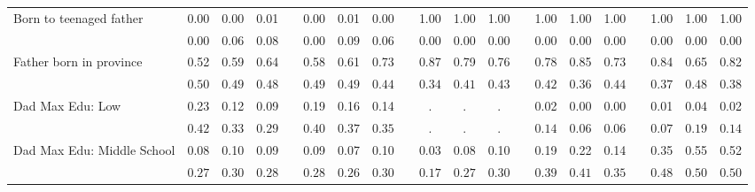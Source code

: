 \begin{center}
{\begin{longtable}{L{6cm} c c c p{.5cm} c c c p{.5cm} c c c p{.5cm} c c c p{.5cm} c c c}
 \quad Born to teenaged father & 0.00 &      0.00 &      0.01 & &      0.00 &      0.01 &      0.00 & &      1.00 &      1.00 &      1.00 & &      1.00 &      1.00 &      1.00 & &      1.00 &      1.00 &      1.00 \\*
 \quad & $\mathit{     0.00}$ & $\mathit{     0.06}$ & $\mathit{     0.08}$ & & $\mathit{     0.00}$ & $\mathit{     0.09}$ & $\mathit{     0.06}$ & & $\mathit{     0.00}$ & $\mathit{     0.00}$ & $\mathit{     0.00}$ & & $\mathit{     0.00}$ & $\mathit{     0.00}$ & $\mathit{     0.00}$ & & $\mathit{     0.00}$ & $\mathit{     0.00}$ & $\mathit{     0.00}$ \\[.2em]
 \quad Father born in province & 0.52 &      0.59 &      0.64 & &      0.58 &      0.61 &      0.73 & &      0.87 &      0.79 &      0.76 & &      0.78 &      0.85 &      0.73 & &      0.84 &      0.65 &      0.82 \\*
 \quad & $\mathit{     0.50}$ & $\mathit{     0.49}$ & $\mathit{     0.48}$ & & $\mathit{     0.49}$ & $\mathit{     0.49}$ & $\mathit{     0.44}$ & & $\mathit{     0.34}$ & $\mathit{     0.41}$ & $\mathit{     0.43}$ & & $\mathit{     0.42}$ & $\mathit{     0.36}$ & $\mathit{     0.44}$ & & $\mathit{     0.37}$ & $\mathit{     0.48}$ & $\mathit{     0.38}$ \\[.2em]
 \quad Dad Max Edu: Low & 0.23 &      0.12 &      0.09 & &      0.19 &      0.16 &      0.14 & &         . &         . &         . & &      0.02 &      0.00 &      0.00 & &      0.01 &      0.04 &      0.02 \\*
 \quad & $\mathit{     0.42}$ & $\mathit{     0.33}$ & $\mathit{     0.29}$ & & $\mathit{     0.40}$ & $\mathit{     0.37}$ & $\mathit{     0.35}$ & & $\mathit{        .}$ & $\mathit{        .}$ & $\mathit{        .}$ & & $\mathit{     0.14}$ & $\mathit{     0.06}$ & $\mathit{     0.06}$ & & $\mathit{     0.07}$ & $\mathit{     0.19}$ & $\mathit{     0.14}$ \\[.2em]
 \quad Dad Max Edu: Middle School & 0.08 &      0.10 &      0.09 & &      0.09 &      0.07 &      0.10 & &      0.03 &      0.08 &      0.10 & &      0.19 &      0.22 &      0.14 & &      0.35 &      0.55 &      0.52 \\*
 \quad & $\mathit{     0.27}$ & $\mathit{     0.30}$ & $\mathit{     0.28}$ & & $\mathit{     0.28}$ & $\mathit{     0.26}$ & $\mathit{     0.30}$ & & $\mathit{     0.17}$ & $\mathit{     0.27}$ & $\mathit{     0.30}$ & & $\mathit{     0.39}$ & $\mathit{     0.41}$ & $\mathit{     0.35}$ & & $\mathit{     0.48}$ & $\mathit{     0.50}$ & $\mathit{     0.50}$ \\[.2em]

\end{longtable}}
\end{center}
